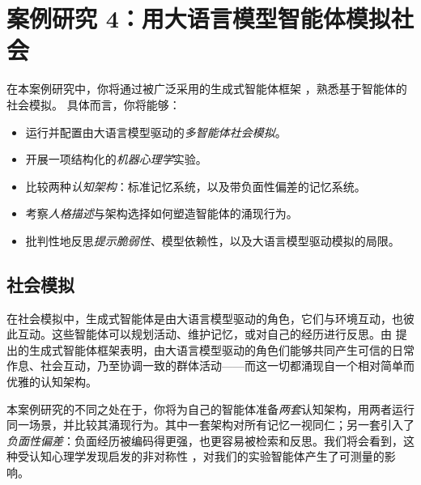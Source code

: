 \chapter[案例研究 4：模拟社会]{案例研究 4：用大语言模型智能体模拟社会}\label{chap:generative_agents}


\begin{learningbox}

在本案例研究中，你将通过被广泛采用的生成式智能体框架 \citep{park2023generative}，熟悉基于智能体的社会模拟。
具体而言，你将能够：

\begin{itemize}[leftmargin=*, nosep]
    \item 运行并配置由大语言模型驱动的{\em 多智能体社会模拟}。
    \item 开展一项结构化的{\em 机器心理学}实验。
    \item 比较两种{\em 认知架构}：标准记忆系统，以及带负面性偏差的记忆系统。
    \item 考察{\em 人格描述}与架构选择如何塑造智能体的涌现行为。
    \item 批判性地反思{\em 提示脆弱性}、模型依赖性，以及大语言模型驱动模拟的局限。
\end{itemize}

\end{learningbox}


\section{社会模拟}
在社会模拟中，生成式智能体是由大语言模型驱动的角色，它们与环境互动，也彼此互动。这些智能体可以规划活动、维护记忆，或对自己的经历进行反思。由 \citet{park2023generative} 提出的生成式智能体框架表明，由大语言模型驱动的角色们能够共同产生可信的日常作息、社会互动，乃至协调一致的群体活动——而这一切都涌现自一个相对简单而优雅的认知架构。

本案例研究的不同之处在于，你将为自己的智能体准备\emph{两套}认知架构，用两者运行同一场景，并比较其涌现行为。其中一套架构对所有记忆一视同仁；另一套引入了\emph{负面性偏差}：负面经历被编码得更强，也更容易被检索和反思。我们将会看到，这种受认知心理学发现启发的非对称性 \citep{baumeister2001bad}，对我们的实验智能体产生了可测量的影响。


